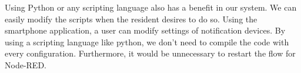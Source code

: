 Using Python or any scripting language also has a benefit in our system. We can easily modify the scripts when the resident desires to do so. Using the smartphone application, a user can modify settings of notification devices. By using a scripting language like python, we don't need to compile the code with every configuration. Furthermore, it would be unnecessary to restart the flow for Node-RED.
